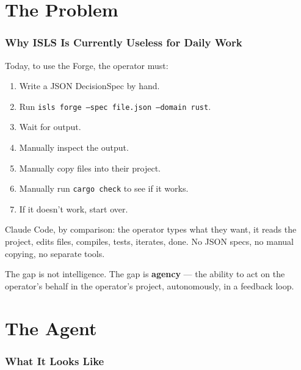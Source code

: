 \documentclass[11pt,a4paper,twoside]{article}
\theoremstyle{definition}
\theoremstyle{remark}
\begin{document}
\tableofcontents
\newpage


\part{The Problem}\label{part:problem}

\section{Why ISLS Is Currently Useless for Daily Work}\label{sec:useless}

Today, to use the Forge, the operator must:
\begin{enumerate}[nosep]
  \item Write a JSON DecisionSpec by hand.
  \item Run \texttt{isls forge --spec file.json --domain rust}.
  \item Wait for output.
  \item Manually inspect the output.
  \item Manually copy files into their project.
  \item Manually run \texttt{cargo check} to see if it works.
  \item If it doesn't work, start over.
\end{enumerate}

Claude Code, by comparison: the operator types what they want, it
reads the project, edits files, compiles, tests, iterates, done.
No JSON specs, no manual copying, no separate tools.

The gap is not intelligence. The gap is \textbf{agency} ---
the ability to act on the operator's behalf in the operator's
project, autonomously, in a feedback loop.


\part{The Agent}\label{part:agent}

\section{What It Looks Like}\label{sec:looks}
\end{document}
